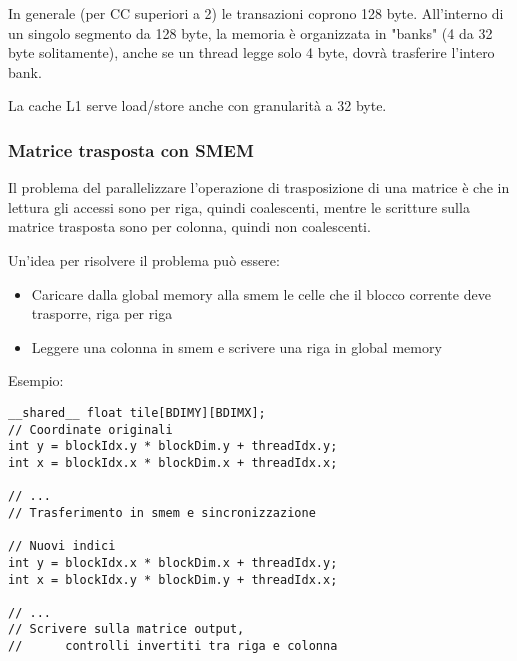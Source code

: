 In generale (per CC superiori a 2) le transazioni coprono 128 byte. All'interno di un singolo segmento da 128 byte, la memoria è organizzata in "banks" (4 da 32 byte solitamente), anche se un thread legge solo 4 byte, dovrà trasferire l'intero bank.

La cache L1 serve load/store anche con granularità a 32 byte.

\subsubsection{Matrice trasposta con SMEM}

Il problema del parallelizzare l'operazione di trasposizione di una matrice  è che in lettura gli accessi sono per riga, quindi coalescenti, mentre le scritture sulla matrice trasposta sono per colonna, quindi non coalescenti.

Un'idea per risolvere il problema può essere: 
\begin{itemize}
	\item Caricare dalla global memory alla smem le celle che il blocco corrente deve trasporre, riga per riga
	
	\item Leggere una colonna in smem e scrivere una riga in global memory
\end{itemize}

Esempio:
\begin{lstlisting}
__shared__ float tile[BDIMY][BDIMX];
// Coordinate originali
int y = blockIdx.y * blockDim.y + threadIdx.y;
int x = blockIdx.x * blockDim.x + threadIdx.x;

// ...
// Trasferimento in smem e sincronizzazione

// Nuovi indici
int y = blockIdx.x * blockDim.x + threadIdx.y;
int x = blockIdx.y * blockDim.y + threadIdx.x;

// ...
// Scrivere sulla matrice output, 
//      controlli invertiti tra riga e colonna
\end{lstlisting}